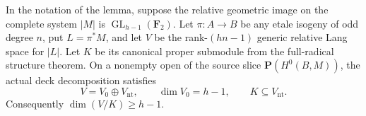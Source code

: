 \begin{proposition}
\label{prop:DE-general-odd-source-quotient-bound}
In the notation of the lemma, suppose the relative geometric image
on the complete system \(|M|\) is
\(\operatorname{GL}_{h-1}(\mathbf F_2)\).
Let \(\pi:A\to B\) be any etale isogeny of odd degree \(n\),
put \(L=\pi^*M\), and let \(V\) be the rank-\((hn-1)\) generic
relative Lang space for \(|L|\). Let \(K\) be its canonical
proper submodule from the full-radical structure theorem.
On a nonempty open of the source slice \(\mathbf P(H^0(B,M))\),
the actual deck decomposition satisfies
\[
 V=V_0\oplus V_{\mathrm{nt}},\qquad
 \dim V_0=h-1,\qquad
 K\subseteq V_{\mathrm{nt}}.
 \tag{DE-GOS6}
\]
Consequently \(\dim(V/K)\geq h-1\).
\end{proposition}
